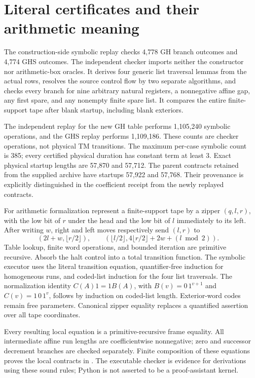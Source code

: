 \section{Literal certificates and their arithmetic meaning}
The construction-side symbolic replay checks 4,778 GH branch outcomes
and 4,774 GHS outcomes. The independent checker imports neither the
constructor nor arithmetic-box oracles. It derives four generic list
traversal lemmas from the actual rows, resolves the source control flow
by two separate algorithms, and checks every branch for nine arbitrary
natural registers, a nonnegative affine gap, any first spare, and any
nonempty finite spare list. It compares the entire finite-support tape
after blank startup, including blank exteriors.

The independent replay for the new GH table performs 1,105,240 symbolic
operations, and the GHS replay performs 1,109,186. These counts are
checker operations, not physical TM transitions. The maximum per-case
symbolic count is 385; every certified physical duration has constant
term at least 3. Exact physical startup lengths are 57,870 and 57,712.
The parent contracts retained from the supplied archive have startups
57,922 and 57,768. Their provenance is explicitly distinguished in the
coefficient receipt from the newly replayed contracts.

For arithmetic formalization represent a finite-support tape by a
zipper $(q,l,r)$, with the low bit of $r$ under the head and the low bit
of $l$ immediately to its left. After writing $w$, right and left moves
respectively send $(l,r)$ to
\[
 (2l+w,\lfloor r/2\rfloor),\qquad
 (\lfloor l/2\rfloor,4\lfloor r/2\rfloor+2w+(l\bmod2)).
\]
Table lookup, finite word operations, and bounded iteration are primitive
recursive. Absorb the halt control into a total transition function.
The symbolic executor uses the literal transition equation, quantifier-free
induction for homogeneous runs, and coded-list induction for the four
list traversals. The normalization identity
$C(A)1=1B(A)$, with $B(v)=0\,1^{v+1}$ and $C(v)=1\,0\,1^v$,
follows by induction on coded-list length. Exterior-word codes remain
free parameters. Canonical zipper equality replaces a quantified
assertion over all tape coordinates.

Every resulting local equation is a primitive-recursive frame equality.
All intermediate affine run lengths are coefficientwise nonnegative;
zero and successor decrement branches are checked separately. Finite
composition of these equations proves the local contracts in \ipra.
The executable checker is evidence for derivations using these sound
rules; Python is not asserted to be a proof-assistant kernel.

